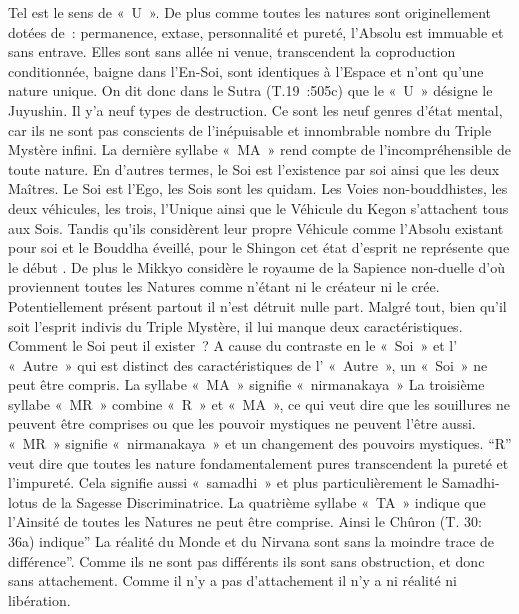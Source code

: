 Tel est le sens de « U ».
De plus comme toutes les natures sont originellement dotées de : permanence, extase, personnalité et pureté, l’Absolu est immuable et sans entrave. Elles sont sans allée ni venue, transcendent la coproduction conditionnée, baigne dans l’En-Soi, sont identiques à l’Espace et n’ont qu’une nature unique. On dit donc dans le Sutra (T.19 :505c) que le « U » désigne le Juyushin.
 Il y’a neuf types de destruction. Ce sont les neuf genres d’état mental, car ils ne sont pas conscients de l’inépuisable et innombrable nombre du Triple Mystère infini.
La dernière syllabe « MA » rend compte de l’incompréhensible de toute nature. En d’autres termes, le Soi est l’existence par soi ainsi que les deux Maîtres. Le Soi est l’Ego, les Sois sont les quidam.
Les Voies non-bouddhistes, les deux véhicules, les trois, l’Unique ainsi que le Véhicule du Kegon s’attachent tous aux Sois. Tandis qu’ils considèrent leur propre Véhicule comme l’Absolu existant pour soi et le Bouddha éveillé, pour le Shingon cet état d’esprit ne représente que le début . De plus le Mikkyo considère le royaume de la Sapience non-duelle d’où proviennent toutes les Natures comme n’étant ni le créateur ni le crée. Potentiellement présent partout il n’est détruit nulle part. Malgré tout, bien qu’il soit l’esprit indivis du Triple Mystère, il lui manque deux caractéristiques.
 Comment le Soi peut il exister ? A cause du contraste en le « Soi » et l’  « Autre » qui est distinct des caractéristiques de l’ « Autre », un « Soi » ne peut être compris. La syllabe « MA » signifie « nirmanakaya »
La troisième syllabe « MR » combine « R » et « MA », ce qui veut dire que les souillures ne peuvent être comprises ou que les pouvoir mystiques ne peuvent l’être aussi. « MR » signifie « nirmanakaya » et un changement des pouvoirs mystiques. “R” veut dire que toutes les nature fondamentalement pures transcendent la pureté et l’impureté. Cela signifie aussi  « samadhi » et plus particulièrement le Samadhi-lotus de la Sagesse Discriminatrice.
La quatrième syllabe « TA » indique que l’Ainsité de toutes les Natures ne peut être comprise. Ainsi le Chûron (T. 30: 36a) indique” La réalité du Monde et du Nirvana sont sans la moindre trace de différence”. Comme ils ne sont pas différents ils sont sans obstruction, et donc sans attachement. Comme il n’y a pas d’attachement il n’y a ni réalité ni libération.
